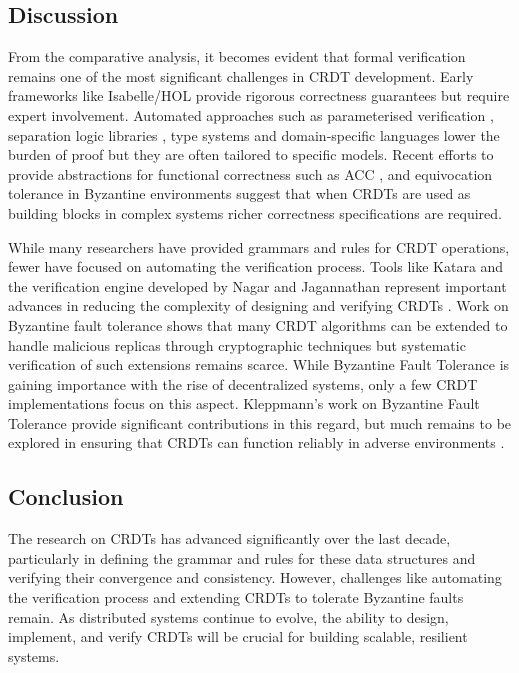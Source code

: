 \subsection{Discussion}

From the comparative analysis, it becomes evident that formal verification remains one of the most significant challenges in CRDT development. Early frameworks like Isabelle/HOL provide rigorous correctness guarantees but require expert involvement. Automated approaches such as parameterised verification \cite{nagar2019automated}, separation logic libraries \cite{nieto2022modular}, type systems \cite{zakhour2023type} and domain‐specific languages \cite{porre2024verifx} lower the burden of proof but they are often tailored to specific models. Recent efforts to provide abstractions for functional correctness such as ACC \cite{liang2021abstraction}, and equivocation tolerance in Byzantine environments \cite{jacob2022byzantine} suggest that when CRDTs are used as building blocks in complex systems richer correctness specifications are required.

While many researchers have provided grammars and rules for CRDT operations, fewer have focused on automating the verification process. Tools like Katara and the verification engine developed by Nagar and Jagannathan represent important advances in reducing the complexity of designing and verifying CRDTs \cite{laddad2022katara,nagar2019automated}. Work on Byzantine fault tolerance shows that many CRDT algorithms can be extended to handle malicious replicas through cryptographic techniques \cite{kleppmann2022making} but systematic verification of such extensions remains scarce. While Byzantine Fault Tolerance is gaining importance with the rise of decentralized systems, only a few CRDT implementations focus on this aspect. Kleppmann's work on Byzantine Fault Tolerance provide significant contributions in this regard, but much remains to be explored in ensuring that CRDTs can function reliably in adverse environments \cite{kleppmann2022making}.

\subsection{Conclusion}

The research on CRDTs has advanced significantly over the last decade, particularly in defining the grammar and rules for these data structures and verifying their convergence and consistency. However, challenges like automating the verification process and extending CRDTs to tolerate Byzantine faults remain. As distributed systems continue to evolve, the ability to design, implement, and verify CRDTs will be crucial for building scalable, resilient systems.


\endinput